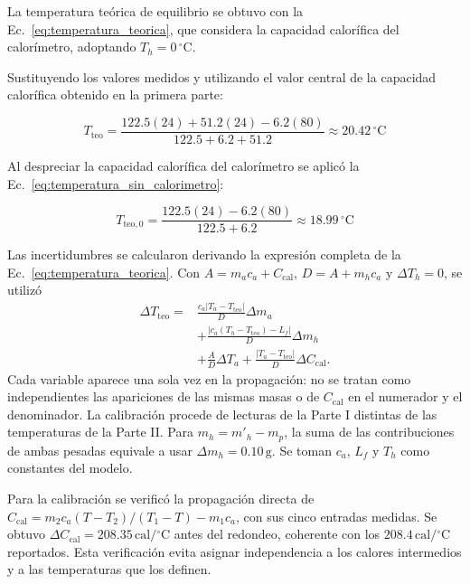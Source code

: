 La temperatura teórica de equilibrio se obtuvo con la Ec.~\eqref{eq:temperatura_teorica}, que considera la capacidad calorífica del calorímetro, adoptando $T_h=0\,{}^{\circ}\mathrm{C}$.

Sustituyendo los valores medidos y utilizando el valor central de la capacidad calorífica obtenido en la primera parte:

\begin{equation*}
    T_{\mathrm{teo}}=
    \frac{122.5(24)+51.2(24)-6.2(80)}
    {122.5+6.2+51.2}
    \approx20.42\,^\circ\mathrm{C}
\end{equation*}

Al despreciar la capacidad calorífica del calorímetro se aplicó la Ec.~\eqref{eq:temperatura_sin_calorimetro}:

\begin{equation*}
    T_{\mathrm{teo},0}=
    \frac{122.5(24)-6.2(80)}
    {122.5+6.2}
    \approx18.99\,^\circ\mathrm{C}
\end{equation*}

Las incertidumbres se calcularon derivando la expresión completa de la Ec.~\eqref{eq:temperatura_teorica}. Con $A=m_ac_a+C_{\mathrm{cal}}$, $D=A+m_hc_a$ y $\Delta T_h=0$, se utilizó
\begin{equation}
  \begin{split}
    \Delta T_{\mathrm{teo}}={}&\frac{c_a|T_a-T_{\mathrm{teo}}|}{D}\Delta m_a\\
    &+\frac{|c_a(T_h-T_{\mathrm{teo}})-L_f|}{D}\Delta m_h\\
    &+\frac{A}{D}\Delta T_a
      +\frac{|T_a-T_{\mathrm{teo}}|}{D}\Delta C_{\mathrm{cal}}.
  \end{split}
  \label{eq:incertidumbre_temperatura_teorica}
\end{equation}
Cada variable aparece una sola vez en la propagación: no se tratan como independientes las apariciones de las mismas masas o de $C_{\mathrm{cal}}$ en el numerador y el denominador. La calibración procede de lecturas de la Parte I distintas de las temperaturas de la Parte II. Para $m_h=m'_h-m_p$, la suma de las contribuciones de ambas pesadas equivale a usar $\Delta m_h=0.10\,\mathrm{g}$. Se toman $c_a$, $L_f$ y $T_h$ como constantes del modelo.

Para la calibración se verificó la propagación directa de $C_{\mathrm{cal}}=m_2c_a(T-T_2)/(T_1-T)-m_1c_a$, con sus cinco entradas medidas. Se obtuvo $\Delta C_{\mathrm{cal}}=208.35\,\mathrm{cal}/{}^{\circ}\mathrm{C}$ antes del redondeo, coherente con los $208.4\,\mathrm{cal}/{}^{\circ}\mathrm{C}$ reportados. Esta verificación evita asignar independencia a los calores intermedios y a las temperaturas que los definen.

